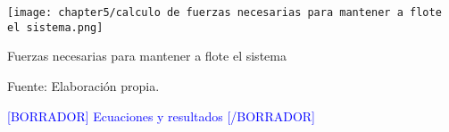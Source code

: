 \begin{myfigure}[H]
	\footnotesize\centering
	\texttt{[image: chapter5/calculo de fuerzas necesarias para mantener a flote el sistema.png]}
	\caption{Fuerzas necesarias para mantener a flote el sistema}
	\begin{myflushcenter}
		Fuente: Elaboración propia.
	\end{myflushcenter}
	\label{fig:refuerzo subsistema de flotacion}
\end{myfigure}

\textcolor{blue}{[BORRADOR] Ecuaciones y resultados [/BORRADOR]} 



